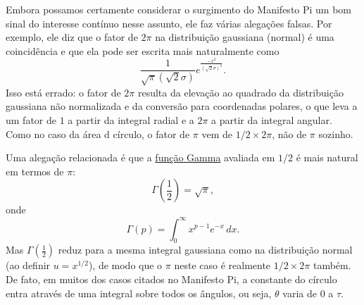 {Embora possamos certamente considerar o surgimento do Manifesto Pi um bom sinal do interesse contínuo nesse assunto, ele faz várias alegações falsas. Por exemplo, ele diz que o fator de $2\pi$ na distribuição gaussiana (normal) é uma coincidência e que ela pode ser escrita mais naturalmente como
\[
\frac{1}{\sqrt\pi(\sqrt 2\sigma)}e^{\frac{-x^2}{(\sqrt 2\sigma)^2}}.
\]
Isso está errado: o fator de $2\pi$ resulta da elevação ao quadrado da distribuição gaussiana não normalizada e da conversão para coordenadas polares, o que leva a um fator de $1$ a partir da integral radial e a $2\pi$ a partir da integral angular. Como no caso da área d círculo, o fator de $\pi$ vem de $1/2\times 2\pi$, não de $\pi$ sozinho.

Uma alegação relacionada é que a \href{https://mathworld.wolfram.com/GammaFunction.html}{função Gamma} avaliada em $1/2$ é mais natural em termos de $\pi$:
\[
\Gamma(\textstyle{\frac{1}{2}}) = \sqrt{\pi},
\]
onde
\begin{equation}
\label{eq:gamma}
\Gamma(p) = \int_{0}^{\infty} x^{p-1} e^{-x}\,dx.
\end{equation}
Mas $\Gamma(\frac{1}{2})$ reduz para a mesma integral gaussiana como na distribuição normal (ao definir $u = x^{1/2}$), de modo que o $\pi$ neste caso é realmente $1/2\times 2\pi$ também. De fato, em muitos dos casos citados no Manifesto Pi, a constante do círculo entra através de uma integral sobre todos os ângulos, ou seja, $\theta$ varia de $0$ a $\tau$.

}
